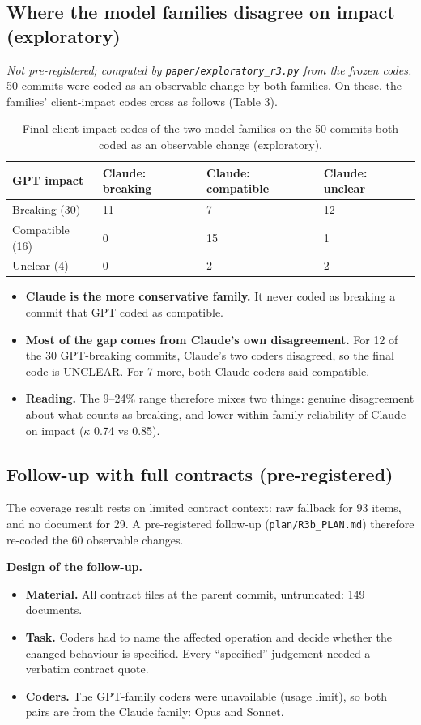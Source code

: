 \documentclass[conference]{IEEEtran}
\begin{document}
\subsection{Where the model families disagree on impact (exploratory)}
\emph{Not pre-registered; computed by \texttt{paper/\allowbreak{}exploratory\_r3.py} from the frozen codes.} 50 commits were coded as an observable change by both families. On these, the families' client-impact codes cross as follows (Table 3).

\begin{table}[t]
\caption{Final client-impact codes of the two model families on the 50 commits both coded as an observable change (exploratory).}
\footnotesize
\begin{tabularx}{\linewidth}{Xlll}
\toprule
GPT impact & Claude: breaking & Claude: compatible & Claude: unclear \\
\midrule
Breaking (30) & 11 & 7 & 12 \\
Compatible (16) & 0 & 15 & 1 \\
Unclear (4) & 0 & 2 & 2 \\
\bottomrule
\end{tabularx}
\end{table}

\begin{itemize}
\item \textbf{Claude is the more conservative family.} It never coded as breaking a commit that GPT coded as compatible.
\item \textbf{Most of the gap comes from Claude's own disagreement.} For 12 of the 30 GPT-breaking commits, Claude's two coders disagreed, so the final code is UNCLEAR. For 7 more, both Claude coders said compatible.
\item \textbf{Reading.} The 9--24\% range therefore mixes two things: genuine disagreement about what counts as breaking, and lower within-family reliability of Claude on impact ($\kappa$ 0.74 vs 0.85).
\end{itemize}

\subsection{Follow-up with full contracts (pre-registered)}
The coverage result rests on limited contract context: raw fallback for 93 items, and no document for 29. A pre-registered follow-up (\texttt{plan/\allowbreak{}R3b\_PLAN.md}) therefore re-coded the 60 observable changes.

\textbf{Design of the follow-up.}
\begin{itemize}
\item \textbf{Material.} All contract files at the parent commit, untruncated: 149 documents.
\item \textbf{Task.} Coders had to name the affected operation and decide whether the changed behaviour is specified. Every ``specified'' judgement needed a verbatim contract quote.
\item \textbf{Coders.} The GPT-family coders were unavailable (usage limit), so both pairs are from the Claude family: Opus and Sonnet.
\end{itemize}
\end{document}
